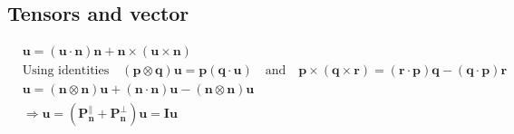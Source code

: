 \documentclass{elsarticle}
\begin{document}
\subsection{Tensors and vector}
\begin{align*}
    &\bm{u}=(\bm{u}\cdot\bm{n})\bm{n}+\bm{n}\times(\bm{u}\times\bm{n})\\
    &\text{Using identities} \quad (\bm{p}\otimes\bm{q})\bm{u}=\bm{p}(\bm{q}\cdot\bm{u})\quad\text{and}\quad \bm{p}\times(\bm{q}\times\bm{r})=(\bm{r}\cdot\bm{p})\bm{q}-(\bm{q}\cdot\bm{p})\bm{r}\\
    &\bm{u}=(\bm{n}\otimes\bm{n})\bm{u}+(\bm{n}\cdot\bm{n})\bm{u}-(\bm{n}\otimes\bm{n})\bm{u}\\
    &\Rightarrow\bm{u}=(\mathbf{P}^{\parallel}_{\bm{n}}+\mathbf{P}^{\perp}_{\bm{n}})\bm{u}=\mathbf{I}\bm{u}
\end{align*}
\end{document}
